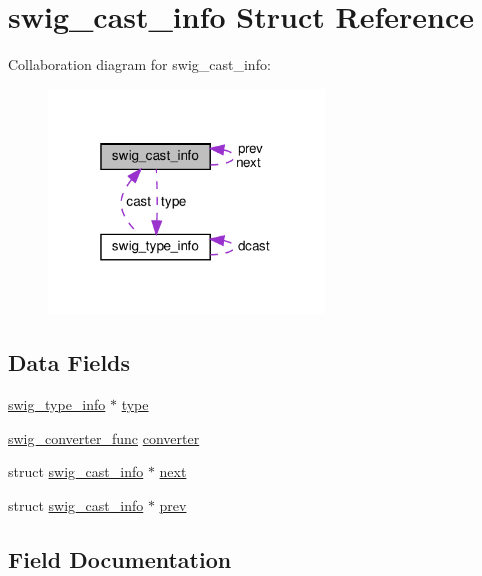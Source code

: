 \hypertarget{structswig__cast__info}{}\section{swig\+\_\+cast\+\_\+info Struct Reference}
\label{structswig__cast__info}


Collaboration diagram for swig\+\_\+cast\+\_\+info\+:\nopagebreak
\begin{figure}[H]
\begin{center}
\leavevmode
\includegraphics[width=208pt]{structswig__cast__info__coll__graph}
\end{center}
\end{figure}
\subsection*{Data Fields}
\begin{DoxyCompactItemize}
\item 
\hyperlink{structswig__type__info}{swig\+\_\+type\+\_\+info} $\ast$ \hyperlink{structswig__cast__info_a1c9023a301c8d6806209f4e10df6e9e0}{type}
\item 
\hyperlink{pdnsim__wrap_8cpp_a9a51597c7c2041da303a65468011f59b}{swig\+\_\+converter\+\_\+func} \hyperlink{structswig__cast__info_aa630fddfbb1bf9c97a03f9479ba32f76}{converter}
\item 
struct \hyperlink{structswig__cast__info}{swig\+\_\+cast\+\_\+info} $\ast$ \hyperlink{structswig__cast__info_ae79c6fa058a9d908bbdac14db0c9db5e}{next}
\item 
struct \hyperlink{structswig__cast__info}{swig\+\_\+cast\+\_\+info} $\ast$ \hyperlink{structswig__cast__info_afc685bcf38a5a06c6601775138c5999c}{prev}
\end{DoxyCompactItemize}


\subsection{Field Documentation}
\mbox{\label{structswig__cast__info_aa630fddfbb1bf9c97a03f9479ba32f76}} 
